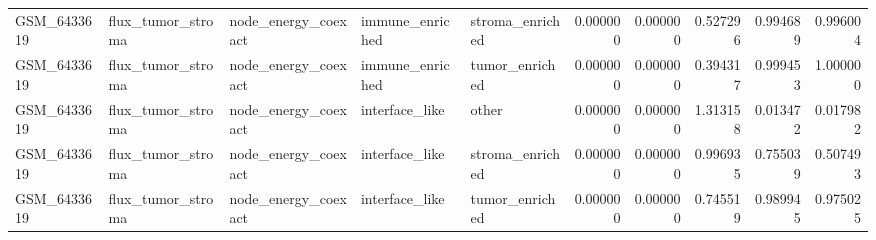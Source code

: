 \begin{table}
\begin{tabular}{lllllrrrrr}
GSM_6433619 & flux_tumor_stroma & node_energy_coexact & immune_enriched & stroma_enriched & 0.000000 & 0.000000 & 0.527296 & 0.994689 & 0.996004 \\
GSM_6433619 & flux_tumor_stroma & node_energy_coexact & immune_enriched & tumor_enriched & 0.000000 & 0.000000 & 0.394317 & 0.999453 & 1.000000 \\
GSM_6433619 & flux_tumor_stroma & node_energy_coexact & interface_like & other & 0.000000 & 0.000000 & 1.313158 & 0.013472 & 0.017982 \\
GSM_6433619 & flux_tumor_stroma & node_energy_coexact & interface_like & stroma_enriched & 0.000000 & 0.000000 & 0.996935 & 0.755039 & 0.507493 \\
GSM_6433619 & flux_tumor_stroma & node_energy_coexact & interface_like & tumor_enriched & 0.000000 & 0.000000 & 0.745519 & 0.989945 & 0.975025 \\
\bottomrule
\end{tabular}
\end{table}
